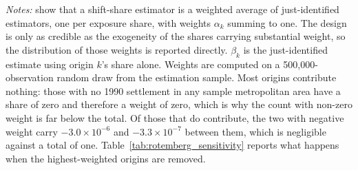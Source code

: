 \begin{table}[!htbp]
\centering
\caption{Rotemberg Weights and Origin-Specific Estimates, Ten Largest Origins}
\label{tab:rotemberg}
\begin{minipage}{\textwidth}
\footnotesize
\vspace{4pt}
\textit{Notes:} \citet{goldsmith2020bartik} show that a shift-share estimator is a weighted average of just-identified estimators, one per exposure share, with weights $\alpha_k$ summing to one. The design is only as credible as the exogeneity of the shares carrying substantial weight, so the distribution of those weights is reported directly. $\beta_k$ is the just-identified estimate using origin $k$'s share alone. Weights are computed on a 500{,}000-observation random draw from the estimation sample. Most origins contribute nothing: those with no 1990 settlement in any sample metropolitan area have a share of zero and therefore a weight of zero, which is why the count with non-zero weight is far below the total. Of those that do contribute, the two with negative weight carry $-3.0 \times 10^{-6}$ and $-3.3 \times 10^{-7}$ between them, which is negligible against a total of one. Table~\ref{tab:rotemberg_sensitivity} reports what happens when the highest-weighted origins are removed.
\end{minipage}
\end{table}

